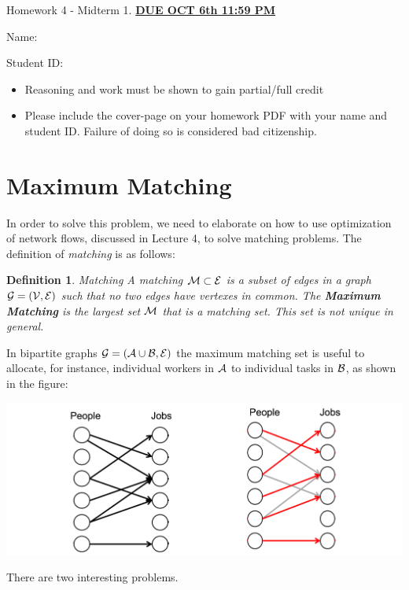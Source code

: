 \documentclass[11pt]{exam}
\newtheorem{definition}{Definition}
\begin{document}
\centerline{\Large \sc Homework 4 - Midterm 1. \underline{\textbf{DUE OCT 6th 11:59 PM}}}
\pagestyle{empty}

\hrulefill

\vspace{2cm}


{\Large \sc Name:}



\vspace{2cm}



{\Large \sc Student ID:}

\vspace{6cm}

\begin{itemize}
  \item Reasoning and work must be shown to gain partial/full
  credit
  \item Please include the cover-page on your homework PDF with your name and student ID. Failure of doing so is considered bad citizenship. 

 \end{itemize}

\clearpage
\section*{Maximum Matching}
 In order to solve this problem, we need to elaborate on how to use optimization of network flows, discussed in Lecture 4, to solve matching problems. The definition of {\it matching} is as follows:
 \begin{definition}{Matching}
 A matching ${\cal M}\subset {\cal E}$ is a subset of edges in a graph ${\cal G}=({\cal V},{\cal E})$ such that no two edges have vertexes in common. 
 The {\bf Maximum Matching} is the largest set ${\cal M}$ that is a matching set. This set is not unique in general. 
 \end{definition}
In bipartite graphs ${\cal G}=({\cal A}\cup {\cal B},{\cal E})$ the maximum matching set is useful to allocate, for instance, individual workers in ${\cal A}$ to individual tasks in ${\cal B}$, as shown in the figure:
\begin{center}
\includegraphics[width=0.8\linewidth]{people_jobs.png}
\end{center}
There are two interesting problems. 
\end{document}
